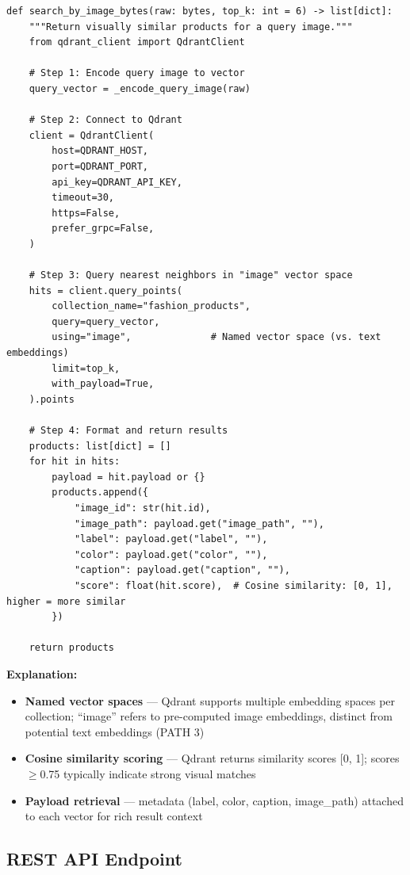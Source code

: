 \documentclass[12pt, twoside]{report}
\begin{document}
\begin{lstlisting}[caption={Qdrant Vector Search --- search/image\_query\_engine.py}]
def search_by_image_bytes(raw: bytes, top_k: int = 6) -> list[dict]:
    """Return visually similar products for a query image."""
    from qdrant_client import QdrantClient
    
    # Step 1: Encode query image to vector
    query_vector = _encode_query_image(raw)
    
    # Step 2: Connect to Qdrant
    client = QdrantClient(
        host=QDRANT_HOST,
        port=QDRANT_PORT,
        api_key=QDRANT_API_KEY,
        timeout=30,
        https=False,
        prefer_grpc=False,
    )
    
    # Step 3: Query nearest neighbors in "image" vector space
    hits = client.query_points(
        collection_name="fashion_products",
        query=query_vector,
        using="image",              # Named vector space (vs. text embeddings)
        limit=top_k,
        with_payload=True,
    ).points
    
    # Step 4: Format and return results
    products: list[dict] = []
    for hit in hits:
        payload = hit.payload or {}
        products.append({
            "image_id": str(hit.id),
            "image_path": payload.get("image_path", ""),
            "label": payload.get("label", ""),
            "color": payload.get("color", ""),
            "caption": payload.get("caption", ""),
            "score": float(hit.score),  # Cosine similarity: [0, 1], higher = more similar
        })
    
    return products
\end{lstlisting}

\textbf{Explanation:}
\begin{itemize}
    \item \textbf{Named vector spaces} --- Qdrant supports multiple embedding spaces per collection; ``image'' refers to pre-computed image embeddings, distinct from potential text embeddings (PATH 3)
    \item \textbf{Cosine similarity scoring} --- Qdrant returns similarity scores [0, 1]; scores $\geq$0.75 typically indicate strong visual matches
    \item \textbf{Payload retrieval} --- metadata (label, color, caption, image\_path) attached to each vector for rich result context
\end{itemize}

\subsection{REST API Endpoint}
\end{document}
